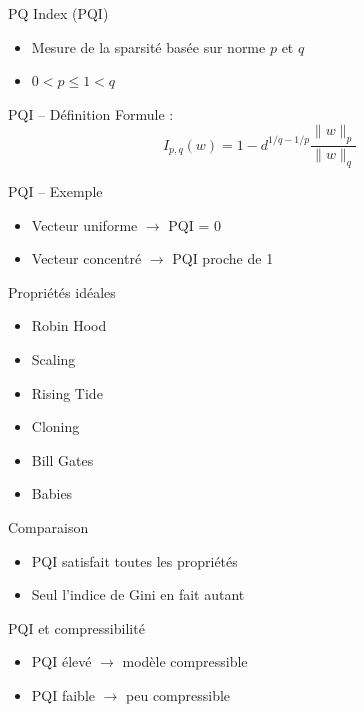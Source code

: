 \documentclass{beamer}
\begin{document}
\begin{frame}{PQ Index (PQI)}
\begin{itemize}
\item Mesure de la sparsité basée sur norme $p$ et $q$
\item $0 < p \leq 1 < q$
\end{itemize}
\end{frame}

\begin{frame}{PQI – Définition}
Formule : 
\[ I_{p,q}(w) = 1 - d^{1/q - 1/p} \frac{\|w\|_p}{\|w\|_q} \]
\end{frame}

\begin{frame}{PQI – Exemple}
\begin{itemize}
\item Vecteur uniforme $\rightarrow$ PQI = 0
\item Vecteur concentré $\rightarrow$ PQI proche de 1
\end{itemize}
\end{frame}

\begin{frame}{Propriétés idéales}
\begin{itemize}
\item Robin Hood
\item Scaling
\item Rising Tide
\item Cloning
\item Bill Gates
\item Babies
\end{itemize}
\end{frame}

\begin{frame}{Comparaison}
\begin{itemize}
\item PQI satisfait toutes les propriétés
\item Seul l’indice de Gini en fait autant
\end{itemize}
\end{frame}

\begin{frame}{PQI et compressibilité}
\begin{itemize}
\item PQI élevé $\rightarrow$ modèle compressible
\item PQI faible $\rightarrow$ peu compressible
\end{itemize}
\end{frame}
\end{document}
